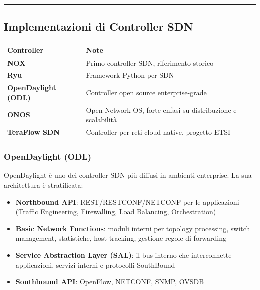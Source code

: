 \documentclass[
  italian,
  openany]{book}
\newcounter{none} %
\providecommand{\tightlist}{%
  \setlength{\itemsep}{0pt}\setlength{\parskip}{0pt}}
\begin{document}
\begin{center}\rule{0.5\linewidth}{0.5pt}\end{center}

\subsection{Implementazioni di Controller
SDN}\label{implementazioni-di-controller-sdn}

{\def\LTcaptype{none} %
\begin{longtable}[]{@{}
  >{\raggedright\arraybackslash}p{}
  >{\raggedright\arraybackslash}p{}@{}}
\toprule\noalign{}
\begin{minipage}[b]{\linewidth}\raggedright
Controller
\end{minipage} & \begin{minipage}[b]{\linewidth}\raggedright
Note
\end{minipage} \\
\midrule\noalign{}
\endhead
\bottomrule\noalign{}
\endlastfoot
\textbf{NOX} & Primo controller SDN, riferimento storico \\
\textbf{Ryu} & Framework Python per SDN \\
\textbf{OpenDaylight (ODL)} & Controller open source enterprise-grade \\
\textbf{ONOS} & Open Network OS, forte enfasi su distribuzione e
scalabilità \\
\textbf{TeraFlow SDN} & Controller per reti cloud-native, progetto
ETSI \\
\end{longtable}
}

\subsubsection{OpenDaylight (ODL)}\label{opendaylight-odl}

OpenDaylight è uno dei controller SDN più diffusi in ambienti
enterprise. La sua architettura è stratificata:

\begin{itemize}
\tightlist
\item
  \textbf{Northbound API}: REST/RESTCONF/NETCONF per le applicazioni
  (Traffic Engineering, Firewalling, Load Balancing, Orchestration)
\item
  \textbf{Basic Network Functions}: moduli interni per topology
  processing, switch management, statistiche, host tracking, gestione
  regole di forwarding
\item
  \textbf{Service Abstraction Layer (SAL)}: il bus interno che
  interconnette applicazioni, servizi interni e protocolli SouthBound
\item
  \textbf{Southbound API}: OpenFlow, NETCONF, SNMP, OVSDB
\end{itemize}
\end{document}
